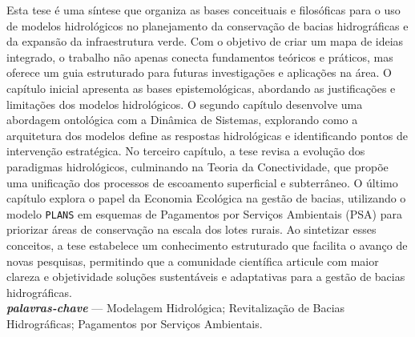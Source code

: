 \documentclass[./main.tex]{subfiles}
\begin{document}
\large

\newpage
\renewcommand{\headrulewidth}{0pt}
\thispagestyle{fancy}
\fancyhf{} %
\fancyfoot{} %
\fancyfoot[C]{\thepage}

\begin{center}
    \vspace{5mm}
\end{center}
\singlespacing
\normalsize
Esta tese é uma síntese que organiza as bases conceituais e filosóficas para o uso de modelos hidrológicos no planejamento da conservação de bacias hidrográficas e da expansão da infraestrutura verde. Com o objetivo de criar um mapa de ideias integrado, o trabalho não apenas conecta fundamentos teóricos e práticos, mas oferece um guia estruturado para futuras investigações e aplicações na área. O capítulo inicial apresenta as bases epistemológicas, abordando as justificações e limitações dos modelos hidrológicos. O segundo capítulo desenvolve uma abordagem ontológica com a Dinâmica de Sistemas, explorando como a arquitetura dos modelos define as respostas hidrológicas e identificando pontos de intervenção estratégica. No terceiro capítulo, a tese revisa a evolução dos paradigmas hidrológicos, culminando na Teoria da Conectividade, que propõe uma unificação dos processos de escoamento superficial e subterrâneo. O último capítulo explora o papel da Economia Ecológica na gestão de bacias, utilizando o modelo \texttt{PLANS} em esquemas de Pagamentos por Serviços Ambientais (PSA) para priorizar áreas de conservação na escala dos lotes rurais. Ao sintetizar esses conceitos, a tese estabelece um conhecimento estruturado que facilita o avanço de novas pesquisas, permitindo que a comunidade científica articule com maior clareza e objetividade soluções sustentáveis e adaptativas para a gestão de bacias hidrográficas.\\[2ex]
	
\noindent \textit{\textbf{palavras-chave}} --- Modelagem Hidrológica; Revitalização de Bacias Hidrográficas; Pagamentos por Serviços Ambientais.
\clearpage
\end{document}
